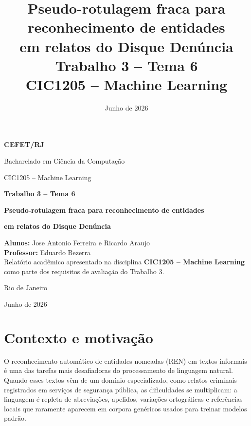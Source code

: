 \documentclass[12pt,a4paper]{article}
\title{%
  \textbf{Pseudo-rotulagem fraca para reconhecimento de entidades}\\
  \textbf{em relatos do Disque Denúncia}\\[6pt]
  \large Trabalho 3 -- Tema 6\\
  CIC1205 -- Machine Learning
}
\author{}
\date{Junho de 2026}
\begin{document}
\begin{titlepage}
\thispagestyle{empty}
\begin{center}
  {\large\bfseries CEFET/RJ\par}
  \vspace{0.2cm}
  {\large Bacharelado em Ciência da Computação\par}
  \vspace{0.2cm}
  {\normalsize CIC1205 -- Machine Learning\par}

  \vfill

  {\Large\bfseries Trabalho 3 -- Tema 6\par}
  \vspace{1.4cm}
  {\LARGE\bfseries Pseudo-rotulagem fraca para reconhecimento de entidades\par}
  \vspace{0.35cm}
  {\LARGE\bfseries em relatos do Disque Denúncia\par}

  \vfill

  \begin{minipage}{0.82\textwidth}
    \raggedright
    \normalsize
    \textbf{Alunos:} Jose Antonio Ferreira e Ricardo Araujo\\[0.5cm]
    \textbf{Professor:} Eduardo Bezerra\\[0.5cm]
    Relatório acadêmico apresentado na disciplina
    \textbf{CIC1205 -- Machine Learning} como parte dos requisitos de
    avaliação do Trabalho 3.
  \end{minipage}

  \vfill

  {\large Rio de Janeiro\par}
  \vspace{0.15cm}
  {\large Junho de 2026\par}
\end{center}
\end{titlepage}

\tableofcontents
\newpage

\section{Contexto e motivação}

O reconhecimento automático de entidades nomeadas (REN) em textos informais é
uma das tarefas mais desafiadoras do processamento de linguagem natural. Quando
esses textos vêm de um domínio especializado, como relatos criminais registrados
em serviços de segurança pública, as dificuldades se multiplicam: a linguagem é
repleta de abreviações, apelidos, variações ortográficas e referências locais que
raramente aparecem em corpora genéricos usados para treinar modelos padrão.
\end{document}
